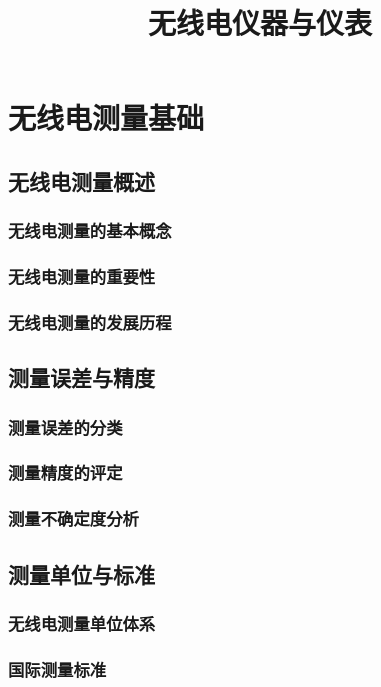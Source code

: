 \documentclass[12pt,UTF8]{ctexbook}
\begin{document}
\frontmatter

\title{无线电仪器与仪表}
\author{}
\date{}
\maketitle

\tableofcontents

\mainmatter

\part{无线电测量基础}

\chapter{无线电测量概述}
\section{无线电测量的基本概念}
\section{无线电测量的重要性}
\section{无线电测量的发展历程}

\chapter{测量误差与精度}
\section{测量误差的分类}
\section{测量精度的评定}
\section{测量不确定度分析}

\chapter{测量单位与标准}
\section{无线电测量单位体系}
\section{国际测量标准}
\end{document}
